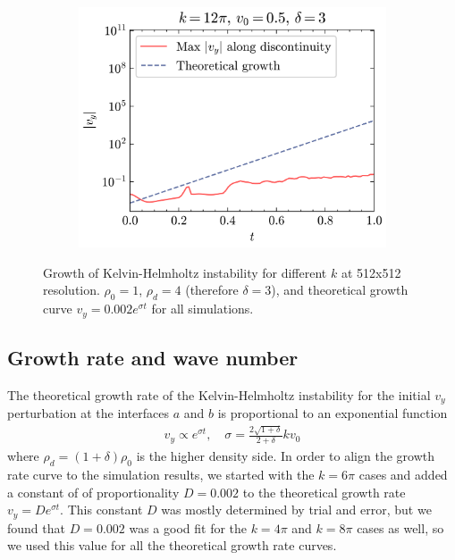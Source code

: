 \documentclass{article}
\begin{document}
\begin{figure}[htbp]
\begin{subfigure}{0.31\textwidth}
        \includegraphics[width=\textwidth]{images/kh_growth_k12.png}
        \caption{}
    \end{subfigure}
    \captionsetup{width=0.8\textwidth}
    \caption{Growth of Kelvin-Helmholtz instability for different $k$ at 512x512 resolution.
    $\rho_0 = 1$, $\rho_d = 4$ (therefore $\delta = 3$), and theoretical growth curve $v_y = 0.002 e^{\sigma t}$ for all simulations.}
    \label{fig:kh_growth}
\end{figure}

\newpage
\subsection*{Growth rate and wave number}

The theoretical growth rate of the Kelvin-Helmholtz instability for the initial $v_y$ perturbation at the interfaces $a$ and $b$ is proportional to an exponential function
\begin{align*}
    v_y \propto e^{\sigma t}, \quad \sigma = \frac{2\sqrt{1 + \delta}}{2 + \delta} k v_0
\end{align*}
where $\rho_d = (1 + \delta) \rho_0$ is the higher density side. In order to align the growth rate curve to the simulation results,
we started with the $k = 6\pi$ cases and added a constant of of proportionality $D = 0.002$ to the theoretical growth rate $v_y = D e^{\sigma t}$.
This constant $D$ was mostly determined by trial and error, but we found that $D = 0.002$ was a good fit for the $k = 4\pi$ and $k = 8\pi$ cases as well,
so we used this value for all the theoretical growth rate curves.
\end{document}
